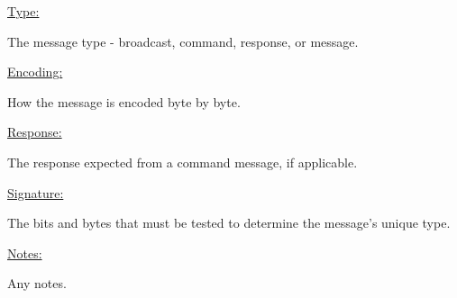 \underline{Type:}

The message type - broadcast, command, response, or message.

\underline{Encoding:} 

How the message is encoded byte by byte.

\underline{Response:} 

The response expected from a command message, if applicable.

\underline{Signature:}

The bits and bytes that must be tested to determine the message's unique type.

\underline{Notes:} 

Any notes.
































































